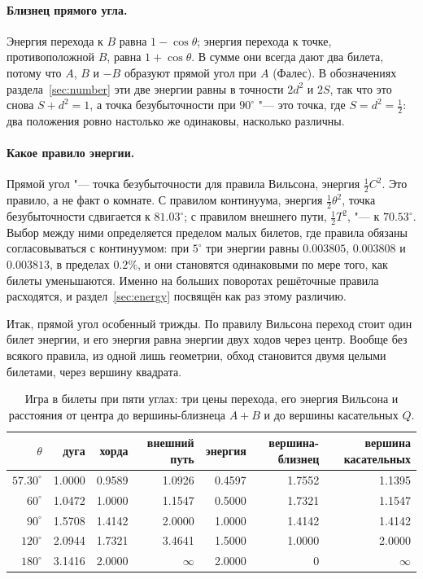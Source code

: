 \paragraph{Близнец прямого угла.} Энергия перехода к $B$ равна $1-\cos\theta$;
энергия перехода к точке, противоположной $B$, равна $1+\cos\theta$. В сумме они всегда дают два
билета, потому что $A$, $B$ и $-B$ образуют прямой угол при $A$ (Фалес). В обозначениях
раздела~\ref{sec:number} эти две энергии равны в точности $2d^2$ и $2S$, так что это снова $S+d^2=1$,
а точка безубыточности при $90^\circ$ "--- это точка, где $S=d^2=\tfrac12$: два
положения ровно настолько же одинаковы, насколько различны.

\paragraph{Какое правило энергии.} Прямой угол "--- точка безубыточности для правила Вильсона, энергия
$\tfrac12C^2$. Это правило, а не факт о комнате. С правилом континуума, энергия
$\tfrac12\theta^2$, точка безубыточности сдвигается к $81.03^\circ$; с правилом внешнего пути,
$\tfrac12T^2$, "--- к $70.53^\circ$. Выбор между ними определяется пределом малых билетов, где
правила обязаны согласовываться с континуумом: при $5^\circ$ три энергии равны $0.003805$,
$0.003808$ и $0.003813$, в пределах $0.2\%$, и они становятся одинаковыми по мере того, как билеты уменьшаются.
Именно на больших поворотах решёточные правила расходятся, и раздел~\ref{sec:energy} посвящён как раз
этому различию.

Итак, прямой угол особенный трижды. По правилу Вильсона переход стоит один
билет энергии, и его энергия равна энергии двух ходов через центр. Вообще без всякого правила,
из одной лишь геометрии, обход становится двумя целыми билетами, через вершину квадрата.

\begin{table}[h!]\centering\small
\caption{Игра в билеты при пяти углах: три цены перехода, его энергия
Вильсона и расстояния от центра до вершины-близнеца $A+B$ и до вершины
касательных $Q$.}
\label{tab:tickets}
\begin{tabular}{rrrrrrr}\toprule
$\theta$ & дуга & хорда & внешний путь & энергия & вершина-близнец & вершина касательных \\ \midrule
$57.30^\circ$ & 1.0000 & 0.9589 & 1.0926 & 0.4597 & 1.7552 & 1.1395 \\
$60^\circ$ & 1.0472 & 1.0000 & 1.1547 & 0.5000 & 1.7321 & 1.1547 \\
$90^\circ$ & 1.5708 & 1.4142 & 2.0000 & 1.0000 & 1.4142 & 1.4142 \\
$120^\circ$ & 2.0944 & 1.7321 & 3.4641 & 1.5000 & 1.0000 & 2.0000 \\
$180^\circ$ & 3.1416 & 2.0000 & $\infty$ & 2.0000 & 0 & $\infty$ \\
\bottomrule\end{tabular}
\end{table}


